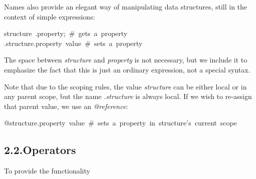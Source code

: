 \documentclass[preprint]{{sigplanconf}}
\begin{document}
\noindent Names also provide an elegant way of manipulating data structures, still in the context of simple expressions:%
\begin{mdpre}%
\noindent{}structure~.property;~\#~gets~a~property\\
.structure.property~value~\#~sets~a~property~%
\end{mdpre}\noindent The space between \emph{structure} and \emph{property} is not necessary, but we include it to emphasize the fact
that this is just an ordinary expression, not a special syntax.

Note that due to the scoping rules, the value \emph{structure} can be either
local or in any parent scope, but the name \emph{.structure} is always local.  If we wish to 
re-assign that parent value, we use an \emph{@reference}:%
\begin{mdpre}%
\noindent{}@structure.property~value~\#~sets~a~property~in~structure's~current~scope~~%
\end{mdpre}
\subsection{2.2.\hspace*{0.5em}Operators}\label{sec-operators}%

\noindent To provide the functionality%
\end{document}
